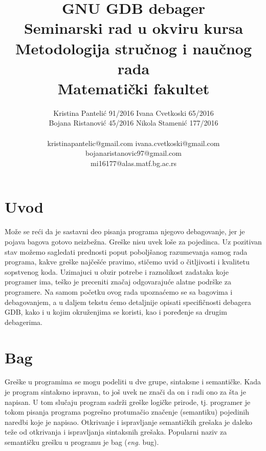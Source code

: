 \documentclass[a4paper]{article}
\begin{document}
\title{GNU GDB debager\\ \small{Seminarski rad u okviru kursa\\Metodologija stručnog i naučnog rada\\ Matematički fakultet}}

\author{Kristina Pantelić 91/2016 
Ivana Cvetkoski 65/2016\\
Bojana Ristanović 45/2016 
Nikola Stamenić 177/2016\\ 
\\kristinapantelic@gmail.com  
ivana.cvetkoski@gmail.com\\
bojanaristanovic97@gmail.com\\
mi16177@alas.matf.bg.ac.rs}


\maketitle


\tableofcontents

\newpage

\section{Uvod}
\label{sec:uvod}

Može se reći da je sastavni deo pisanja programa njegovo
debagovanje, jer je pojava bagova gotovo neizbežna. Greške nisu uvek
loše za pojedinca. Uz pozitivan stav možemo sagledati prednosti
poput poboljšanog razumevanja samog rada programa,
kakve greške najčešće pravimo, stičemo uvid o čitljivosti i
kvalitetu sopstvenog koda. Uzimajuci u obzir potrebe i raznolikost
zadataka koje programer ima, teško je preceniti značaj odgovarajuće
alatne podrške za programere. \cite{seminarski_rad}
Na samom početku ovog rada
upoznaćemo se sa bagovima i debagovanjem, a u daljem tekstu ćemo
detaljnije opisati specifičnosti debagera GDB, kako i u kojim
okruženjima se koristi, kao i poređenje sa drugim debagerima. 

\section{Bag}
\label{sec:bag}
Greške u programima se mogu podeliti u dve grupe, sintaksne i semantičke. Kada je program sintaksno ispravan, to još uvek
 ne znači da on i radi ono za šta je napisan. U tom slučaju program sadrži greške logičke prirode, tj. programer je tokom 
 pisanja programa  pogrešno protumačio značenje (semantiku) pojedinih naredbi koje je napisao. Otkrivanje i ispravljanje 
 semantičkih grešaka je daleko teže od otkrivanja i ispravljanja sintaksnih grešaka. Popularni naziv za semantičku grešku 
 u programu je bag (\textit{eng.} bug).
\end{document}
